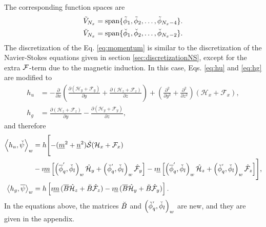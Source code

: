 The corresponding function spaces are
\begin{align}
\tilde{V}_{N_x} &= \text{span} \{\tilde{\phi}_1, \tilde{\phi}_2, 
\ldots, \tilde{\phi}_{N_x-4} \}. \label{eq:phiNBspace} \\
\breve{V}_{N_x} &= \text{span} \{\breve{\phi}_1, \breve{\phi}_2, 
\ldots, \breve{\phi}_{N_x-2} \}. \label{eq:phiNBspace}
\end{align}
The discretization of the Eq. \ref{eq:momentum} is similar to the discretization of the Navier-Stokes equations given in section \ref{sec:discretizationNS}, except for the extra $\bf{\mathcal{F}}$-term due to the magnetic induction. In this case, Eqs. \ref{eq:hu} and \ref{eq:hg} are modified to
\begin{align}
h_u &= -\frac{\partial}{\partial x} \left( \frac{\partial 
(\mathcal{H}_y + \mathcal{F}_y)}{\partial y} + \frac{\partial (\mathcal{H}_z+\mathcal{F}_z)}{\partial z} \right) 
+ \left(\frac{\partial^2}{\partial y^2} + \frac{\partial^2}{\partial z^2} 
\right) (\mathcal{H}_x + \mathcal{F}_x ), 
\\
h_g &= \frac{\partial( \mathcal{H}_z+ \mathcal{F}_z)}{\partial y} - \frac{\partial 
(\mathcal{H}_y+\mathcal{F}_y)}{\partial z},
\end{align}
and therefore
\begin{align*}
\left<h_u, \check{\psi} \right>_w &= h\Biggl[-(\underline{m}^2+\underline{n}^2) 
\check{\mathcal{S}}(\mathcal{H}_x + \mathcal{F}_x) \\
&- \imath \underline{m}\left[\left(\overline{\phi}_q^{'}, 
\check{\phi}_l \right)_w \hat{\mathcal{H}}_y +\left(\breve{\phi}_q^{'}, 
\check{\phi}_l \right)_w \hat{\mathcal{F}}_y\right] 
- \imath \underline{n} \left[\left(\overline{\phi}_q^{'}, \check{\phi}_l \right)_w \hat{\mathcal{H}}_z +\left(\breve{\phi}_q^{'}, \check{\phi}_l \right)_w \hat{\mathcal{F}}_z \right]\Biggr], \\
\left< h_g, \overline{\psi} \right>_w &= h\left[ \imath \underline{m}\, (\overline{B} 
\hat{\mathcal{H}}_z + \breve{B} 
\hat{\mathcal{F}}_z) - \imath \underline{n}\,(\overline{B} \hat{\mathcal{H}}_y+  \breve{B} \hat{\mathcal{F}}_y )
\right].
\end{align*}
In the equations above, the matrices $\breve{B}$ and $\left(\breve{\phi}_q^{'}, \check{\phi}_l \right)_w$ are new, and they are given in the appendix. 

